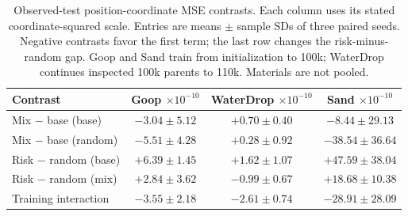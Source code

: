 \begin{table}[t]
\centering\scriptsize
\caption{Observed-test position-coordinate MSE contrasts. Each column uses its stated coordinate-squared scale. Entries are means $\pm$ sample SDs of three paired seeds. Negative contrasts favor the first term; the last row changes the risk-minus-random gap. Goop and Sand train from initialization to 100k; WaterDrop continues inspected 100k parents to 110k. Materials are not pooled.}
\label{tab:goop-exposure-placement}
\setlength{\tabcolsep}{2pt}
\begin{tabular}{lccc}
\toprule
Contrast & \shortstack{Goop\\$\times10^{-10}$} & \shortstack{WaterDrop\\$\times10^{-10}$} & \shortstack{Sand\\$\times10^{-10}$}\\
\midrule
Mix $-$ base (base) & $-3.04\pm5.12$ & $+0.70\pm0.40$ & $-8.44\pm29.13$\\
Mix $-$ base (random) & $-5.51\pm4.28$ & $+0.28\pm0.92$ & $-38.54\pm36.64$\\
Risk $-$ random (base) & $+6.39\pm1.45$ & $+1.62\pm1.07$ & $+47.59\pm38.04$\\
Risk $-$ random (mix) & $+2.84\pm3.62$ & $-0.99\pm0.67$ & $+18.68\pm10.38$\\
Training interaction & $-3.55\pm2.18$ & $-2.61\pm0.74$ & $-28.91\pm28.09$\\
\bottomrule
\end{tabular}
\end{table}
